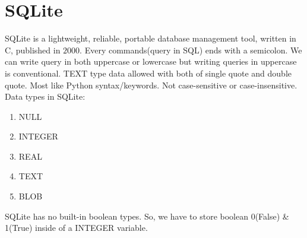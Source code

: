 \documentclass[12 pt, letterpaper]{extarticle}
\begin{document}
\section*{SQLite}
\justify
{
	SQLite is a lightweight, reliable, portable database management tool, written in C, published in $2000$. Every commands(query in SQL) ends with a semicolon. We can write query in both uppercase or lowercase but writing queries in uppercase is conventional. TEXT type data allowed with both of single quote and double quote. Most like Python syntax/keywords. Not case-sensitive or case-insensitive.\\
}
Data types in SQLite:
\begin{enumerate}
	\item NULL
	\item INTEGER
	\item REAL
	\item TEXT
	\item BLOB
\end{enumerate}
SQLite has no built-in boolean types. So, we have to store boolean 0(False) \& 1(True) inside of a INTEGER variable.\\
\end{document}
